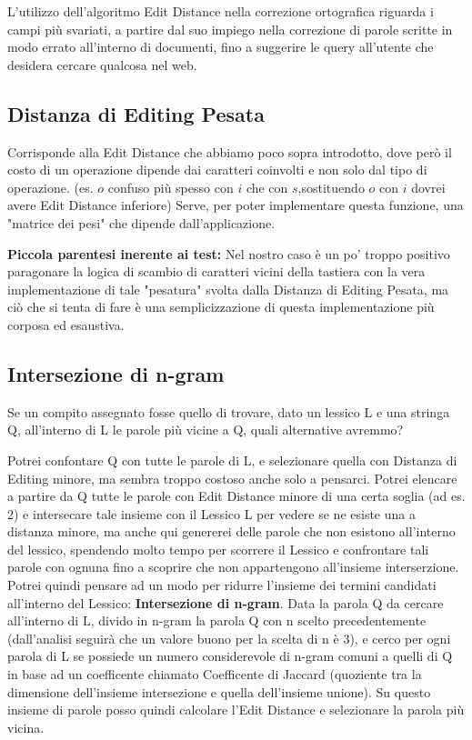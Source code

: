 \documentclass{article}
\begin{document}
L'utilizzo dell'algoritmo Edit Distance nella correzione ortografica riguarda i campi più svariati, a partire dal suo impiego nella correzione di parole scritte in modo errato all'interno di documenti, fino a suggerire le query all'utente che desidera cercare qualcosa nel web.

\subsection{Distanza di Editing Pesata}
Corrisponde alla Edit Distance che abbiamo poco sopra introdotto, dove però il costo di un operazione dipende dai caratteri coinvolti e non solo dal tipo di operazione.
(es. $o$ confuso più spesso con $i$ che con $s$,sostituendo $o$ con $i$ dovrei avere Edit Distance inferiore)
Serve, per poter implementare questa funzione, una "matrice dei pesi" che dipende dall'applicazione.

\textbf{Piccola parentesi inerente ai test:} Nel nostro caso è un po' troppo positivo paragonare la logica di scambio di caratteri vicini della tastiera con la vera implementazione di tale "pesatura" svolta dalla Distanza di Editing Pesata, ma ciò che si tenta di fare è una semplicizzazione di questa implementazione più corposa ed esaustiva.

\subsection{Intersezione di n-gram}
Se un compito assegnato fosse quello di trovare, dato un lessico L e una stringa Q, all'interno di L le parole più vicine a Q, quali alternative avremmo? 

Potrei confontare Q con tutte le parole di L, e selezionare quella con Distanza di Editing minore, ma sembra troppo costoso anche solo a pensarci. 
Potrei elencare a partire da Q tutte le parole con Edit Distance minore di una certa soglia (ad es. 2) e intersecare tale insieme con il Lessico L per vedere se ne esiste una a distanza minore, ma anche qui genererei delle parole che non esistono all'interno del lessico, spendendo molto tempo per scorrere il Lessico e confrontare tali parole con ognuna fino a scoprire che non appartengono all'insieme interserzione. 
Potrei quindi pensare ad un modo per ridurre l'insieme dei termini candidati all'interno del Lessico: \textbf{Intersezione di n-gram}.
Data la parola Q da cercare all'interno di L, divido in n-gram la parola Q con n scelto precedentemente (dall'analisi seguirà che un valore buono per la scelta di n è 3), e cerco per ogni parola di L se possiede un numero considerevole di n-gram comuni a quelli di Q in base ad un coefficente chiamato Coefficente di Jaccard (quoziente tra la dimensione dell'insieme intersezione e quella dell'insieme unione). Su questo insieme di parole posso quindi calcolare l'Edit Distance e selezionare la parola più vicina.
\end{document}
